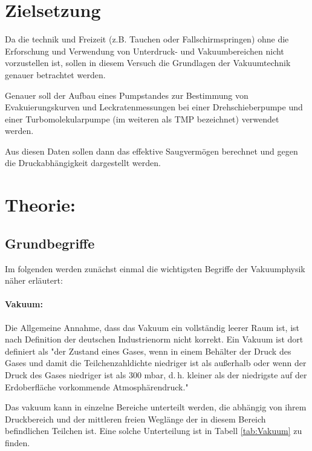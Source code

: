 \section{Zielsetzung}
\label{sec:Zielsetzung}
Da die technik und Freizeit (z.B. Tauchen oder Fallschirmspringen) ohne die Erforschung und Verwendung von Unterdruck- und Vakuumbereichen nicht vorzustellen
ist, sollen in diesem Versuch die Grundlagen der Vakuumtechnik genauer betrachtet werden.

Genauer soll der Aufbau eines Pumpstandes zur Bestimmung von Evakuierungskurven und Leckratenmessungen
 bei einer Drehschieberpumpe und einer Turbomolekularpumpe (im weiteren als TMP bezeichnet) verwendet werden.

 Aus diesen Daten sollen dann das effektive Saugvermögen berechnet und gegen die Druckabhängigkeit dargestellt werden.


\section{Theorie:}
\label{sec:Theorie}
\subsection{Grundbegriffe}

Im folgenden werden zunächst einmal die wichtigsten Begriffe der Vakuumphysik näher erläutert:

\paragraph{Vakuum:}
Die Allgemeine Annahme, dass das Vakuum ein vollständig leerer Raum ist, ist nach Definition der
deutschen Industrienorm nicht korrekt.
Ein Vakuum ist dort definiert als "der Zustand eines Gases, wenn in einem Behälter der
Druck des Gases und damit die Teilchenzahldichte niedriger ist als außerhalb oder wenn der Druck
des Gases niedriger ist als 300 mbar, d. h. kleiner als der niedrigste auf der Erdoberfläche
vorkommende Atmosphärendruck."\cite{vakuum}

Das vakuum kann in einzelne Bereiche unterteilt werden, die abhängig von ihrem Druckbereich und der mittleren
freien Weglänge der in diesem Bereich befindlichen Teilchen ist. Eine solche Unterteilung ist in Tabell \ref{tab:Vakuum}
zu finden.

